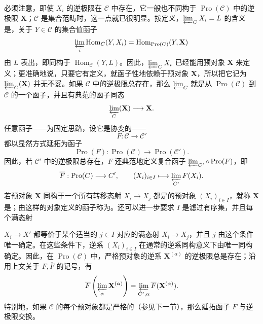 必须注意，即使 $X_i$ 的逆极限在 $\mathcal C$ 中存在，它一般也不同构于 $\operatorname{Pro}(\mathcal C)$ 中的逆极限 $\mathbf X$；$\mathcal C$ 是集合范畴时，这一点就已很明显。按定义，$\varprojlim_{\mathcal C}X_i=L$ 的含义是，关于 $Y\in\mathcal C$ 的集合值函子
\[
 \varprojlim_i\operatorname{Hom}_{\mathcal C}(Y,X_i)
 =\operatorname{Hom}_{\operatorname{Pro}(\mathcal C)}(Y,\mathbf X)
\]
由 $L$ 表出，即同构于 $\operatorname{Hom}_{\mathcal C}(Y,L)$。因此，$\varprojlim_{\mathcal C}X_i$ 已经能用预对象 $\mathbf X$ 来定义；更准确地说，只要它有定义，就函子性地依赖于预对象 $\mathbf X$，所以把它记为 $\varprojlim_{\mathcal C}(\mathbf X)$ 并无不妥。如果 $\mathcal C$ 中的逆极限总存在，那么 $\varprojlim_{\mathcal C}$ 就是从 $\operatorname{Pro}(\mathcal C)$ 到 $\mathcal C$ 的一个函子，并且有典范的函子同态
\[
 \varprojlim_{\mathcal C}(\mathbf X)\longrightarrow\mathbf X.
\]
任意函子——为固定思路，设它是协变的——
\[
 F:\mathcal C\longrightarrow\mathcal C'
\]
都以显然方式延拓为函子
\[
 \operatorname{Pro}(F):\operatorname{Pro}(\mathcal C)\longrightarrow\operatorname{Pro}(\mathcal C').
\]
因此，若 $\mathcal C'$ 中的逆极限总存在，$F$ 还典范地定义复合函子 $\varprojlim_{\mathcal C'}\circ\operatorname{Pro}(F)$，即
\[
 \overline F:\operatorname{Pro}(\mathcal C)\longrightarrow\mathcal C',
 \qquad (X_i)_{i\in I}\longmapsto\varprojlim_{\mathcal C'}F(X_i).
\]
若预对象 $\mathbf X$ 同构于一个所有转移态射 $X_i\to X_j$ 都是的预对象 $(X_i)_{i\in I}$，就称 $\mathbf X$ 是；由这样的对象定义的函子称为。还可以进一步要求 $I$ 是滤过有序集，并且每个满态射

$X_i\to X'$ 都等价于某个适当的 $j\in I$ 对应的满态射 $X_i\to X_j$，并且 $j$ 由这个条件唯一确定。在这些条件下，逆系 $(X_i)_{i\in I}$ 在通常的逆系同构意义下由唯一同构确定。因此，在 $\operatorname{Pro}(\mathcal C)$ 中，严格预对象的逆系 $\mathbf X^{(\alpha)}$ 的逆极限总是存在；沿用上文关于 $F,\overline F$ 的记号，有
\[
 \overline F\left(\varprojlim_\alpha\mathbf X^{(\alpha)}\right)
 =\varprojlim_{\mathcal C',\alpha}\overline F(\mathbf X^{(\alpha)}).
\]
特别地，如果 $\mathcal C$ 的每个预对象都是严格的（参见下一节），那么延拓函子 $\overline F$ 与逆极限交换。

